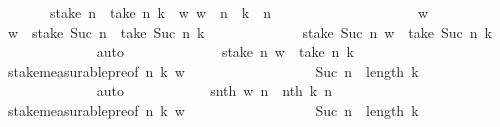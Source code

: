 \begin{isabellebody}
\ \ \ \ \ \ {\isasymsubseteq}\ stake\ n\ {\isacharminus}{\kern0pt}{\isacharbackquote}{\kern0pt}\ {\isacharbraceleft}{\kern0pt}take\ n\ k{\isacharbraceright}{\kern0pt}\ {\isasyminter}\ {\isacharparenleft}{\kern0pt}{\isasymlambda}w{\isachardot}{\kern0pt}\ w\ {\isacharbang}{\kern0pt}{\isacharbang}{\kern0pt}\ n{\isacharparenright}{\kern0pt}\ {\isacharminus}{\kern0pt}{\isacharbackquote}{\kern0pt}\ {\isacharbraceleft}{\kern0pt}k\ {\isacharbang}{\kern0pt}\ n{\isacharbraceright}{\kern0pt}{\isachardoublequoteclose}\isanewline
\ \ \ \ \ \ \ \ \isamarkupfalse%
\isanewline
\ \ \ \ \ \ \ \ \ \ \isamarkupfalse%
\ w\isanewline
\ \ \ \ \ \ \ \ \ \ \isamarkupfalse%
\ {\isachardoublequoteopen}w\ {\isasymin}\ stake\ {\isacharparenleft}{\kern0pt}Suc\ n{\isacharparenright}{\kern0pt}\ {\isacharminus}{\kern0pt}{\isacharbackquote}{\kern0pt}\ {\isacharbraceleft}{\kern0pt}take\ {\isacharparenleft}{\kern0pt}Suc\ n{\isacharparenright}{\kern0pt}\ k{\isacharbraceright}{\kern0pt}{\isachardoublequoteclose}\isanewline
\ \ \ \ \ \ \ \ \ \ \isamarkupfalse%
\ \isamarkupfalse%
\ {\isachardoublequoteopen}stake\ {\isacharparenleft}{\kern0pt}Suc\ n{\isacharparenright}{\kern0pt}\ w\ {\isacharequal}{\kern0pt}\ take\ {\isacharparenleft}{\kern0pt}Suc\ n{\isacharparenright}{\kern0pt}\ k{\isachardoublequoteclose}\isanewline
\ \ \ \ \ \ \ \ \ \ \ \ \isamarkupfalse%
\ auto\isanewline
\ \ \ \ \ \ \ \ \ \ \isamarkupfalse%
\ \isamarkupfalse%
\ {\isachardoublequoteopen}stake\ n\ w\ {\isacharequal}{\kern0pt}\ take\ n\ k{\isachardoublequoteclose}\isanewline
\ \ \ \ \ \ \ \ \ \ \ \ \isamarkupfalse%
\ stake{\isacharunderscore}{\kern0pt}measurable{\isacharunderscore}{\kern0pt}pre{}{\isacharbrackleft}{\kern0pt}of\ n\ k\ w{\isacharbrackright}{\kern0pt}\isanewline
\ \ \ \ \ \ \ \ \ \ \ \ \ \ \ \ \ \ {\isacartoucheopen}Suc\ n\ {\isasymle}\ length\ k{\isacartoucheclose}\isanewline
\ \ \ \ \ \ \ \ \ \ \ \ \isamarkupfalse%
\ auto\isanewline
\ \ \ \ \ \ \ \ \ \ \isamarkupfalse%
\ {\isachardoublequoteopen}snth\ w\ n\ {\isacharequal}{\kern0pt}\ nth\ k\ n{\isachardoublequoteclose}\isanewline
\ \ \ \ \ \ \ \ \ \ \ \ \isamarkupfalse%
\ stake{\isacharunderscore}{\kern0pt}measurable{\isacharunderscore}{\kern0pt}pre{}{\isacharbrackleft}{\kern0pt}of\ n\ k\ w{\isacharbrackright}{\kern0pt}\isanewline
\ \ \ \ \ \ \ \ \ \ \ \ \ \ \ \ \ \ {\isacartoucheopen}Suc\ n\ {\isasymle}\ length\ k{\isacartoucheclose}\isanewline

\end{isabellebody}
